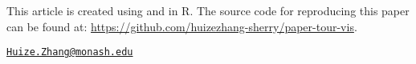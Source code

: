This article is created using \citep{knitr} and
 \citep{rmarkdown} in R. The source code for
reproducing this paper can be found at:
\url{https://github.com/huizezhang-sherry/paper-tour-vis}.

\clearpage




\address{%
H.Sherry Zhang\\
Department of Econometrics and Business Statistics, Monash University\\
\\
}
\href{mailto:Huize.Zhang@monash.edu}{\nolinkurl{Huize.Zhang@monash.edu}}

